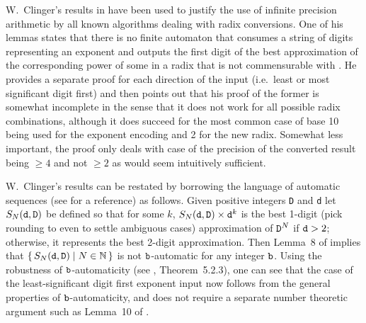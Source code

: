 \documentclass[12pt]{article}
\begin{document}
W.~Clinger's results in \cite{Clinger} have been used to justify the
use of infinite precision 
arithmetic by all known algorithms dealing with radix
conversions. One of his lemmas states that there
is no finite automaton that consumes a string of digits representing
an exponent and outputs the first digit of the best approximation of
the corresponding power of some {\ttD} in a radix that is not
commensurable with {\ttD}. He provides a separate proof for each direction of the input 
(i.e.~least or most significant digit first) and then points
out that his proof of the former is
somewhat incomplete in the sense that it does not work for all possible radix
combinations, although it does succeed for the most common case of base 10
being used for the exponent encoding and 2 for the new radix. Somewhat less important,
the proof only deals with case of the precision
of the converted result being $\geq 4$ and not $\geq 2$ as would seem
intuitively sufficient.

\iffalse
W.~Clinger's results can be restated by borrowing the language of automatic
sequences (see \cite{Allouche} for a reference) as follows.
Given positive integers {\tt D} and {\tt d} let $S_n(\ttd, \ttD)$ be
defined so that for some $k$, $S_n(\ttd, \ttD)\cdot d^k$ is the best
1-digit (for simplicity, assume ${\tt d}>2$, and pick rounding to even
to settle ambiguous cases) approximation of
$\ttD^n$. Then Lemma~8 of \cite{Clinger} implies that 
$\{\,S_n(\ttd, \ttD)\mid n\in{\mathbb N}\,\}$ is not $\ttb$-automatic for any integer
$\ttb$. Using the robustness of $\ttb$-automaticity (see
\cite{Allouche}, Theorem~5.2.3), one can see that the case of the
least-significant digit first exponent input now follows from the general
properties of $\ttb$-automaticity, and does not require a separate
number theoretic argument such as Lemma~10 of \cite{Clinger}. 
\fi

W.~Clinger's results can be restated by borrowing the language of automatic
sequences (see \cite{Allouche} for a reference) as follows.
Given positive integers {\tt D} and {\tt d} let $S_N({\tt d}, {\tt D})$ be
defined so that for some $k$, $S_N({\tt d}, {\tt D})\times {\tt d}^k$ is the best
1-digit (pick rounding to even to settle ambiguous cases)
approximation of ${\tt D}^N$ if ${\tt d}>2$;
otherwise, it represents the best 2-digit approximation.
Then Lemma~8 of \cite{Clinger} implies that 
$\{\,S_N({\tt d}, {\tt D})\mid N\in{\mathbb N}\,\}$ is not $\ttb$-automatic for any integer
$\ttb$. Using the robustness of $\ttb$-automaticity (see
\cite{Allouche}, Theorem~5.2.3), one can see that the case of the
least-significant digit first exponent input now follows from the general
properties of $\ttb$-automaticity, and does not require a separate
number theoretic argument such as Lemma~10 of \cite{Clinger}. 
\end{document}
